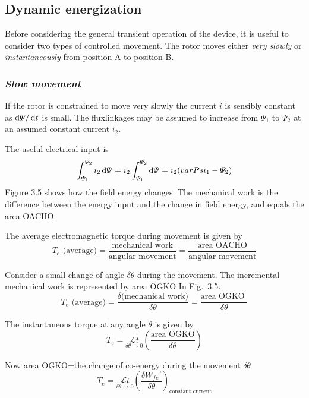 \documentclass[a4paper,numbers=noenddot,12pt]{scrbook}
\begin{document}
\subsection{Dynamic energization}
Before considering the general transient operation of the device, it is useful to consider two types of controlled movement. The rotor moves either \textit{very slowly} or \textit{instantaneously} from position A to position B. 
\subsubsection{\textit{Slow movement}}
If the rotor is constrained to move very slowly the current $i$ is sensibly constant as $\dif \varPsi / \dif t$ is small. The flux­linkages may be assumed to increase from $\varPsi_1$ to $\varPsi_2$ at an assumed constant current $i_2$.

The useful electrical input is 
\begin{equation}
    \int_{\varPsi_1}^{\varPsi_2} i_2 \dif \varPsi = i_2  \int_{\varPsi_1}^{\varPsi_2} \dif \varPsi =  i_2 (varPsi_1 -\varPsi_2)
    \label{eq:Eq3.15}
\end{equation}
Figure 3.5 shows how the field energy changes. The mechanical work is the difference between the energy input and the change in field energy, and equals the area OACHO.\@

The average electromagnetic torque during movement is given by 
\begin{equation}
    T_e \text{\ (average)} = \dfrac{\text{mechanical work}}{\text{angular movement}} = \dfrac{\text{area OACHO}}{\text{angular movement}}
    \label{eq:Eq3.16}
\end{equation}

Consider a small change of angle $\delta \theta$ during the movement. The incremental mechanical work is represented by area OGKO In Fig.\ 3.5.
\begin{equation}
    T_e \text{\ (average)}=\dfrac{\delta\text{(mechanical work)}}{\delta \theta} = \dfrac{\text{area OGKO }}{\delta\theta}
    \label{eq:Eq3.17}
\end{equation}

The instantaneous torque at any angle $\theta$ is given by
\begin{equation}
    T_e = \underset{\delta \theta \to 0}{\mathcal{L} t} \left(\dfrac{\text{area OGKO}}{\delta \theta}\right)
    \label{eq:Eq3.18}
\end{equation}

Now area OGKO=the change of co-energy during the movement $\delta \theta$
\begin{equation}
    T_e = \underset{\delta \theta \to 0}{\mathcal{L} t} {\left(\dfrac{\delta W_{fe}'}{\delta \theta}\right)}_{\text{constant current}}
    \label{eq:Eq3.19}
\end{equation}
\end{document}
